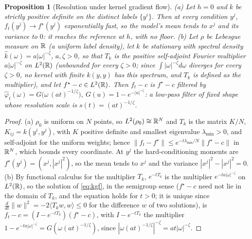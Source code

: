 \documentclass{article}
\theoremstyle{plain}
\newtheorem{proposition}{Proposition}
\theoremstyle{remark}
\begin{document}
\begin{proposition}[Resolution under kernel gradient flow]
\label{prop:specbias}
(a) Let $h=0$ and $k$ be strictly positive definite on the distinct labels
$\{y^i\}$. Then at every condition $y^j$, $f_t(y^j)\to f^\star(y^j)$ exponentially fast,
so the model's mean tends to $x^j$ and its variance to $0$: it reaches the reference
at $h$, with no floor. (b) Let $\rho$ be Lebesgue measure on $\mathbb{R}$ (a uniform label
density), let $k$ be stationary with spectral density $\hat k(\omega)=a|\omega|^{-\zeta}$,
$a,\zeta>0$, so that $T_k$ is the positive self-adjoint Fourier multiplier
$a|\omega|^{-\zeta}$ on $L^2(\mathbb{R})$ (unbounded for every $\zeta>0$; since
$\int|\omega|^{-\zeta}d\omega$ diverges for every $\zeta>0$, no kernel with finite $k(y,y)$
has this spectrum, and $T_k$ is defined as the multiplier), and let $f^\star-c\in L^2(\mathbb{R})$. Then $f_t-c$
is $f^\star-c$ filtered by $\hat\varphi_t(\omega)=G\big(\omega\,(at)^{-1/\zeta}\big)$,
$G(u)=1-e^{-|u|^{-\zeta}}$: a low-pass filter of fixed shape whose resolution scale is
$s(t)=(at)^{-1/\zeta}$.
\end{proposition}

\begin{proof}
(a) $\rho_0$ is uniform on $N$ points, so $L^2(\rho_0)\cong\mathbb{R}^N$ and $T_k$ is the matrix
$K/N$, $K_{ij}=k(y^i,y^j)$, with $K$ positive definite and smallest eigenvalue
$\lambda_{\min}>0$, and self-adjoint for the uniform weights;
hence $\|f_t-f^\star\|\le e^{-t\lambda_{\min}/N}\|f^\star-c\|$ in $\mathbb{R}^N$, which bounds
every coordinate. At $y^j$ the hard-conditioning moments are $f^\star(y^j)=(x^j,|x^j|^2)$,
so the mean tends to $x^j$ and the variance $|x^j|^2-|x^j|^2=0$.
(b) By functional calculus for the multiplier $T_k$, $e^{-tT_k}$ is the multiplier
$e^{-ta|\omega|^{-\zeta}}$ on $L^2(\mathbb{R})$, so the solution of \eqref{eq:kgf}, in the
semigroup sense ($f^\star-c$ need not lie in the domain of $T_k$, and the equation holds
for $t>0$; it is unique since $\frac{d}{dt}\|w\|^2=-2\langle T_kw,w\rangle\le0$ for the
difference $w$ of two solutions), is
$f_t-c=(I-e^{-tT_k})(f^\star-c)$, with $I-e^{-tT_k}$ the multiplier
$1-e^{-ta|\omega|^{-\zeta}}=G(\omega(at)^{-1/\zeta})$, since
$|\omega(at)^{-1/\zeta}|^{-\zeta}=at|\omega|^{-\zeta}$.
\end{proof}
\end{document}
